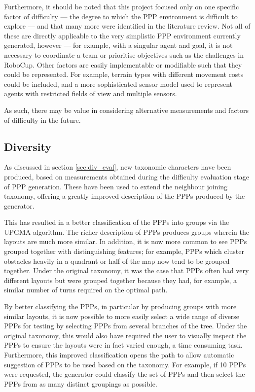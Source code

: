 \documentclass[authoryearcitations]{UoYCSproject}
\begin{document}
Furthermore, it should be noted that this project focused only on one specific factor of difficulty --- the degree to which the PPP environment is difficult to explore --- and that many more were identified in the literature review. Not all of these are directly applicable to the very simplistic PPP environment currently generated, however --- for example, with a singular agent and goal, it is not necessary to coordinate a team or prioritise objectives such as the challenges in RoboCup. Other factors are easily implementable or modifiable such that they could be represented. For example, terrain types with different movement costs could be included, and a more sophisticated sensor model used to represent agents with restricted fields of view and multiple sensors.

As such, there may be value in considering alternative measurements and factors of difficulty in the future.

\subsection{Diversity}
\label{sec:conc_div}

As discussed in section \ref{sec:div_eval}, new taxonomic characters have been produced, based on measurements obtained during the difficulty evaluation stage of PPP generation. These have been used to extend the neighbour joining taxonomy, offering a greatly improved description of the PPPs produced by the generator.

This has resulted in a better classification of the PPPs into groups via the UPGMA algorithm. The richer description of PPPs produces groups wherein the layouts are much more similar. In addition, it is now more common to see PPPs grouped together with distinguishing features; for example, PPPs which cluster obstacles heavily in a quadrant or half of the map now tend to be grouped together. Under the original taxonomy, it was the case that PPPs often had very different layouts but were grouped together because they had, for example, a similar number of turns required on the optimal path.

By better classifying the PPPs, in particular by producing groups with more similar layouts, it is now possible to more easily select a wide range of diverse PPPs for testing by selecting PPPs from several branches of the tree. Under the original taxonomy, this would also have required the user to visually inspect the PPPs to ensure the layouts were in fact varied enough, a time consuming task. Furthermore, this improved classification opens the path to allow automatic suggestion of PPPs to be used based on the taxonomy. For example, if 10 PPPs were requested, the generator could classify the set of PPPs and then select the PPPs from as many distinct groupings as possible.
\end{document}
